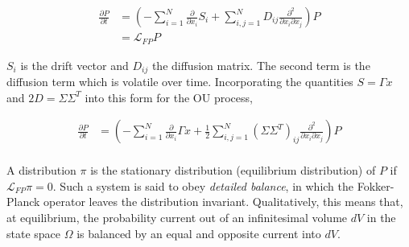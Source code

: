 \documentclass{article}
\begin{document}
\begin{align}
\frac{\partial P}{\partial t}  &= \left(-\sum_{i=1}^{N}\frac{\partial}{\partial x_{i}} S_{i} + \sum_{i,j=1}^{N} D_{ij}\frac{\partial^{2}}{\partial x_{i}\partial x_{j}}\right)P\\
&= \mathcal{L}_{FP} P
\end{align}

$S_{i}$ is the drift vector and $D_{ij}$ the diffusion matrix. The second term is the diffusion term which is volatile over time. Incorporating the quantities $S = \Gamma x$ and $2D = \Sigma\Sigma^{T}$ into this form for the OU process,

\begin{align}
\frac{\partial P}{\partial t}  &= \left(-\sum_{i=1}^{N}\frac{\partial}{\partial x_{i}}\Gamma x + \frac{1}{2}\sum_{i,j=1}^{N}(\Sigma\Sigma^{T})_{ij} \frac{\partial^{2}}{\partial x_{i}\partial x_{j}}\right)P\\
\end{align}

A distribution $\pi$ is the stationary distribution (equilibrium distribution) of $P$ if $\mathcal{L}_{FP}\pi = 0$. Such a system is said to obey \emph{detailed balance}, in which the Fokker-Planck operator leaves the distribution invariant. Qualitatively, this means that, at equilibrium, the probability current out of an infinitesimal volume $dV$ in the state space $\Omega$ is balanced by an equal and opposite current into $dV$. 
\end{document}
